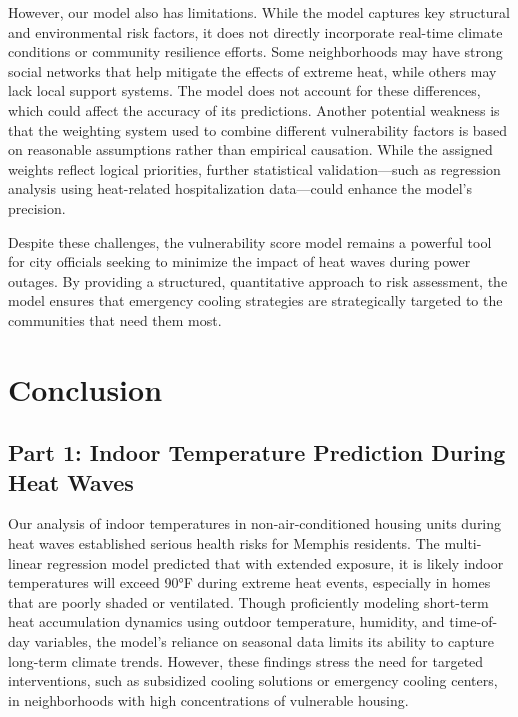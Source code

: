 \documentclass[12pt]{article}
\begin{document}
However, our model also has limitations. While the model captures key structural and environmental risk factors, it does not directly incorporate real-time climate conditions or community resilience efforts. Some neighborhoods may have strong social networks that help mitigate the effects of extreme heat, while others may lack local support systems. The model does not account for these differences, which could affect the accuracy of its predictions. Another potential weakness is that the weighting system used to combine different vulnerability factors is based on reasonable assumptions rather than empirical causation. While the assigned weights reflect logical priorities, further statistical validation—such as regression analysis using heat-related hospitalization data—could enhance the model’s precision.

Despite these challenges, the vulnerability score model remains a powerful tool for city officials seeking to minimize the impact of heat waves during power outages. By providing a structured, quantitative approach to risk assessment, the model ensures that emergency cooling strategies are strategically targeted to the communities that need them most. 

\section{Conclusion}

\subsection{Part 1: Indoor Temperature Prediction During Heat Waves}
Our analysis of indoor temperatures in non-air-conditioned housing units during heat waves established serious health risks for Memphis residents. The multi-linear regression model predicted that with extended exposure, it is likely indoor temperatures will exceed 90°F during extreme heat events, especially in homes that are poorly shaded or ventilated. Though proficiently modeling short-term heat accumulation dynamics using outdoor temperature, humidity, and time-of-day variables, the model's reliance on seasonal data limits its ability to capture long-term climate trends. However, these findings stress the need for targeted interventions, such as subsidized cooling solutions or emergency cooling centers, in neighborhoods with high concentrations of vulnerable housing. 
\end{document}
